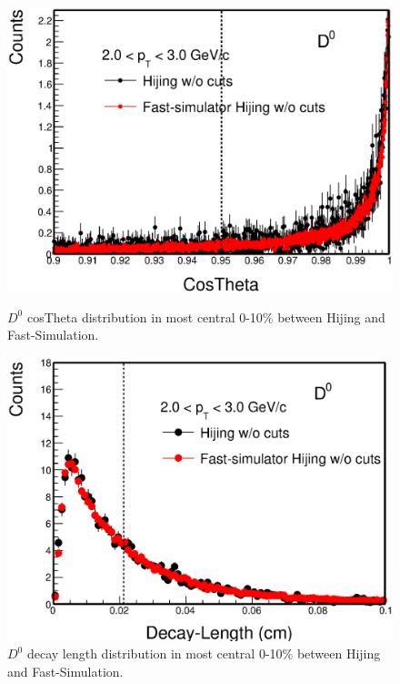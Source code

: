 \begin{figure}[htbp]
\begin{minipage}[htbp]{0.52\linewidth}
\centering
\includegraphics[width=1.0\textwidth,angle=0]{figure/Run14_D0HFT/HijingcosTheta.eps}
\caption{ $D^0$ cosTheta distribution in most central 0-10\% between Hijing and Fast-Simulation.\label{Hijingpointingangle}}
\end{minipage}
\hfill
\begin{minipage}[htbp]{0.52\linewidth}
\centering
\includegraphics[width=1.0\textwidth,angle=0]{figure/Run14_D0HFT/HijingDecayL.eps} 
\caption{ $D^0$ decay length distribution in most central 0-10\% between Hijing and Fast-Simulation.\label{HijingDecayL}}
\end{minipage}
\end{figure}

